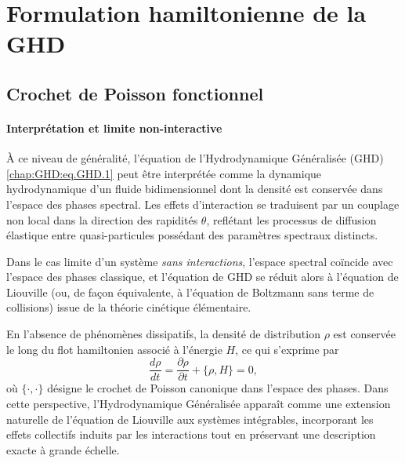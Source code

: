 \section{Formulation hamiltonienne de la GHD}

\subsection{Crochet de Poisson fonctionnel}

\paragraph{Interprétation et limite non-interactive}  
À ce niveau de généralité, l'équation de l’Hydrodynamique Généralisée (GHD) \eqref{chap:GHD:eq.GHD.1} peut être interprétée comme la dynamique hydrodynamique d’un fluide bidimensionnel dont la densité est conservée dans l’espace des phases spectral.  
Les effets d’interaction se traduisent par un couplage non local dans la direction des rapidités $\theta$, reflétant les processus de diffusion élastique entre quasi-particules possédant des paramètres spectraux distincts.

\medskip

Dans le cas limite d’un système \emph{sans interactions}, l’espace spectral coïncide avec l’espace des phases classique, et l’équation de GHD se réduit alors à l’équation de Liouville (ou, de façon équivalente, à l’équation de Boltzmann sans terme de collisions) issue de la théorie cinétique élémentaire.

\medskip

En l’absence de phénomènes dissipatifs, la densité de distribution $\rho$ est conservée le long du flot hamiltonien associé à l’énergie $H$, ce qui s’exprime par
\begin{equation}\label{chap:GHD:eq.Liouv.1}
	\frac{d \rho}{dt} 
	= \frac{\partial \rho}{\partial t } + \{ \rho , H \} = 0,
\end{equation}
où $\{\cdot , \cdot\}$ désigne le crochet de Poisson canonique dans l’espace des phases.  
Dans cette perspective, l’Hydrodynamique Généralisée apparaît comme une extension naturelle de l’équation de Liouville aux systèmes intégrables, incorporant les effets collectifs induits par les interactions tout en préservant une description exacte à grande échelle.


